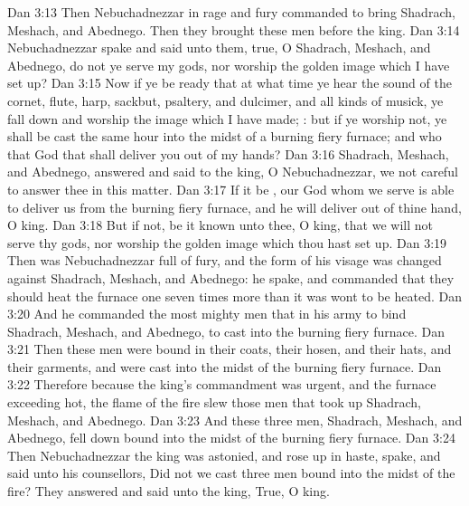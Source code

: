\vs Dan 3:13 Then Nebuchadnezzar in  rage and fury commanded to bring Shadrach, Meshach, and Abednego. Then they brought these men before the king.
\vs Dan 3:14 Nebuchadnezzar spake and said unto them,  true, O Shadrach, Meshach, and Abednego, do not ye serve my gods, nor worship the golden image which I have set up?
\vs Dan 3:15 Now if ye be ready that at what time ye hear the sound of the cornet, flute, harp, sackbut, psaltery, and dulcimer, and all kinds of musick, ye fall down and worship the image which I have made; : but if ye worship not, ye shall be cast the same hour into the midst of a burning fiery furnace; and who  that God that shall deliver you out of my hands?
\vs Dan 3:16 Shadrach, Meshach, and Abednego, answered and said to the king, O Nebuchadnezzar, we  not careful to answer thee in this matter.
\vs Dan 3:17 If it be , our God whom we serve is able to deliver us from the burning fiery furnace, and he will deliver  out of thine hand, O king.
\vs Dan 3:18 But if not, be it known unto thee, O king, that we will not serve thy gods, nor worship the golden image which thou hast set up.
\vs Dan 3:19 Then was Nebuchadnezzar full of fury, and the form of his visage was changed against Shadrach, Meshach, and Abednego:  he spake, and commanded that they should heat the furnace one seven times more than it was wont to be heated.
\vs Dan 3:20 And he commanded the most mighty men that  in his army to bind Shadrach, Meshach, and Abednego,  to cast  into the burning fiery furnace.
\vs Dan 3:21 Then these men were bound in their coats, their hosen, and their hats, and their  garments, and were cast into the midst of the burning fiery furnace.
\vs Dan 3:22 Therefore because the king's commandment was urgent, and the furnace exceeding hot, the flame of the fire slew those men that took up Shadrach, Meshach, and Abednego.
\vs Dan 3:23 And these three men, Shadrach, Meshach, and Abednego, fell down bound into the midst of the burning fiery furnace.
\vs Dan 3:24 Then Nebuchadnezzar the king was astonied, and rose up in haste,  spake, and said unto his counsellors, Did not we cast three men bound into the midst of the fire? They answered and said unto the king, True, O king.
